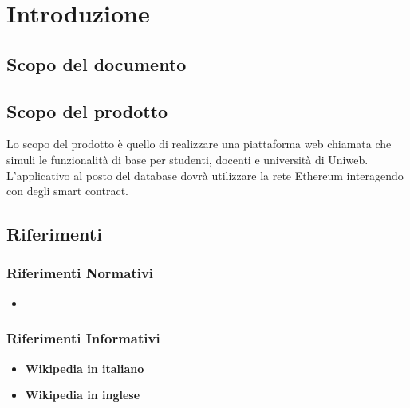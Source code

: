 \documentclass[GlossarioEST.tex]{subfiles}
\begin{document}
\chapter{Introduzione}
\section{Scopo del documento}
\glossExpl
\section{Scopo del prodotto}
Lo scopo del prodotto è quello di realizzare una piattaforma web chiamata \progetto che simuli le funzionalità di base per studenti, docenti e università di Uniweb. L'applicativo al posto del database dovrà utilizzare la rete Ethereum interagendo con degli smart contract.
\section{Riferimenti}
\subsection{Riferimenti Normativi}
\begin{itemize}
	\item \textbf{\ndp \vruno}
\end{itemize}

\subsection{Riferimenti Informativi}
\begin{itemize}
\item \textbf {Wikipedia in italiano\\
	}
\item \textbf {Wikipedia in inglese\\
	}
\end{itemize}
\end{document}

